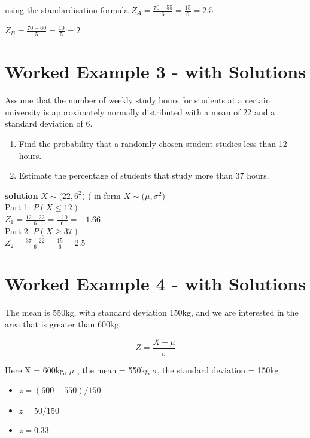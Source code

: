 ﻿\documentclass[]{report}
\begin{document}
using the standardisation formula
$Z_A = \frac{70 - 55}{6} = \frac{15}{6} = 2.5 $

$Z_B = \frac{70 - 60}{5} = \frac{10}{5} = 2 $



\newpage

\section{Worked Example 3 - with Solutions}
Assume that the number of weekly study hours for students at a certain university
is approximately normally distributed with a mean of 22 and a standard deviation
of 6.
\begin{enumerate}
	\item Find the probability that a randomly chosen student studies less than 12
	hours.
	\item Estimate the percentage of students that study more than 37 hours.
\end{enumerate}

\textbf{solution}
$X \sim \mathcal(22,6^2)$  ( in form $X \sim \mathcal(\mu,\sigma^2)$\\

Part 1: $P(X \leq 12)$\\


$Z_1 = \frac{12 - 22}{6} = \frac{-10}{6} = -1.66 $\\

Part 2: $P(X \geq 37)$\\

$Z_2 = \frac{37 - 22}{6} = \frac{15}{6} = 2.5 $\\


\section{Worked Example 4 - with Solutions}
The mean is 550kg, with standard deviation 150kg, and we are interested in the area that is greater than 600kg.

\begin{equation}
Z = \frac{ X - \mu }{ \sigma }
\end{equation}

Here X = 600kg,
$\mu$ , the mean = 550kg
$\sigma$, the standard deviation = 150kg
\begin{itemize}
	\item $z = ( 600 - 550 ) / 150$
	\item $z = 50 / 150$
	\item $z = 0.33$
\end{itemize}
\end{document}
